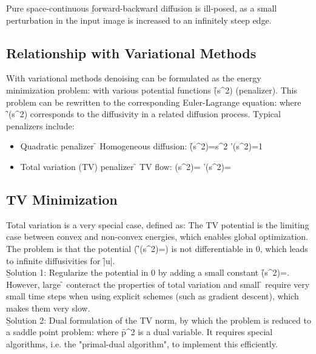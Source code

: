 Pure space-continuous \b{forward-backward diffusion is ill-posed}, as a small perturbation in the input image is increased to an infinitely steep edge.

\subsection{Relationship with Variational Methods}
With variational methods denoising can be formulated as the energy minimization problem:
with various potential functions \f{\Psi(s^2)} (penalizer). This problem can be rewritten to the corresponding Euler-Lagrange equation:
where \f{\Psi'(s^2)} corresponds to the diffusivity in a related diffusion process. Typical penalizers include:
\begin{itemize}
    \item Quadratic penalizer \f{\leftrightarrow} Homogeneous diffusion: \f{\quad\Psi(s^2)=s^2 \quad\Rightarrow\quad \Psi'(s^2)=1}
    \item Total variation (TV) penalizer \f{\leftrightarrow} TV flow: \f{\quad
        \Psi(s^2)= \quad\Rightarrow\quad \Psi'(s^2)=
    }
\end{itemize}

\subsection{TV Minimization}
Total variation is a very special case, defined as:
The TV potential is the limiting case between convex and non-convex energies, which enables global optimization. The problem is that the potential (\f{\Psi'(s^2)=}) is not differentiable in 0, which leads to infinite diffusivities for \f{|\nabla u|}.\\

\b{Solution 1:} Regularize the potential in 0 by adding a small constant \f{\epsilon\to\Psi(s^2)=}. However, large \f{\epsilon} conteract the properties of total variation and small \f{\epsilon} require very small time steps when using explicit schemes (such as gradient descent), which makes them very slow.\\

\b{Solution 2:} Dual formulation of the TV norm, by which the problem is reduced to a saddle point problem:
where \f{p\in{}^2} is a dual variable. It requires special algorithms, i.e. the "primal-dual algorithm", to implement this efficiently.

\newpage